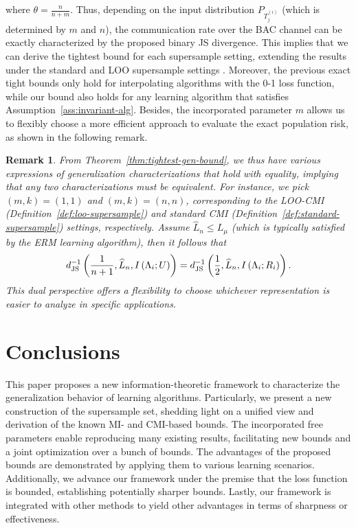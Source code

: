 \documentclass[onecolumn,romanappendices,10pt]{IEEEtran}
\newtheorem{remark}{Remark}
\begin{document}
	where $\theta = \frac{n}{n+m}$. Thus, depending on the input distribution $P_{T^{(i)}_j}$ (which is determined by $m$ and $n$), the communication rate over the BAC channel can be exactly characterized by the proposed binary JS divergence. This implies that we can derive the tightest bound for each supersample setting, extending the results under the standard and LOO supersample settings \cite{wang2023tighter,haghifam2022understanding}. Moreover, the previous exact tight bounds only hold for interpolating algorithms with the 0-1 loss function, while our bound also holds for any learning algorithm that satisfies Assumption~\ref{ass:invariant-alg}. Besides, the incorporated parameter $m$ allows us to flexibly choose a more efficient approach to evaluate the exact population risk, as shown in the following remark.
	\begin{remark}
		From Theorem~\ref{thm:tightest-gen-bound}, we thus have various expressions of generalization characterizations that hold with equality, implying that any two characterizations must be equivalent. For instance, we pick $(m,k)=(1,1)$ and $(m,k)=(n,n)$, corresponding to the LOO-CMI (Definition~\ref{def:loo-supersample}) and standard CMI (Definition~\ref{def:standard-supersample}) settings, respectively. Assume $\widehat{L}_n \leq L_\mu$ (which is typically satisfied by the ERM learning algorithm), then it follows that
		\begin{align}
			d^{-1}_{\textnormal{JS}} \left( \frac{1}{n+1}, \widehat{L}_n, I\left( \Lambda_i; U \right) \right) = d^{-1}_{\textnormal{JS}} \left( \frac{1}{2}, \widehat{L}_n, I\left( \Lambda_i; R_i \right) \right). \label{eq:tightest_bound}
		\end{align}
		This dual perspective offers a flexibility to choose whichever representation is easier to analyze in specific applications.
	\end{remark}
	
	
	\section{Conclusions}\label{sec:conclusion}
	This paper proposes a new information-theoretic framework to characterize the generalization behavior of learning algorithms. Particularly, we present a new construction of the supersample set, shedding light on a unified view and derivation of the known MI- and CMI-based bounds. The incorporated free parameters enable reproducing many existing results, facilitating new bounds and a joint optimization over a bunch of bounds. The advantages of the proposed bounds are demonstrated by applying them to various learning scenarios. Additionally, we advance our framework under the premise that the loss function is bounded, establishing potentially sharper bounds. Lastly, our framework is integrated with other methods to yield other advantages in terms of sharpness or effectiveness.
	
\end{document}
